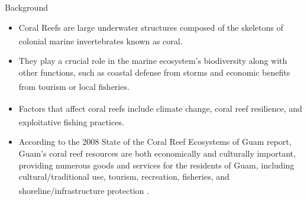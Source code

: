\documentclass{beamer}
\begin{document}
\begin{frame}{Background}
    \begin{itemize}
        \item<1-> Coral Reefs are large underwater structures composed of the skeletons of colonial marine invertebrates known as coral\textsuperscript{\cite{ross}}.
         \item<2-> They play a crucial role in the marine ecosystem's biodiversity along with other functions, such as coastal defense from storms and economic benefits from tourism or local fisheries\textsuperscript{\cite{04_mathanalysis}}.
         \item<3->  Factors that affect coral reefs include climate change, coral reef resilience\textsuperscript{\cite{02_Riegl_Purkis_Model}}, and exploitative fishing practices\textsuperscript{\cite{05_quintero_machuca_cotto_bradley_ríos-soto_2016}}.
         \item<4-> According to the 2008 State of the Coral Reef Ecosystems of Guam report, Guam’s coral reef resources are both economically and culturally important, providing numerous goods and services for the residents of Guam, including cultural/traditional use, tourism, recreation, fisheries, and shoreline/infrastructure protection \textsuperscript{\cite{guamwebsite}}.
    \end{itemize}
\end{frame}
\end{document}
